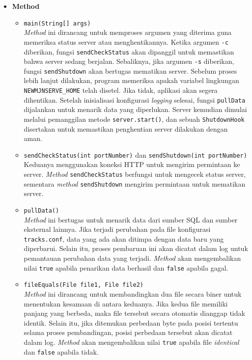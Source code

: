 \begin{itemize}
    \item \textbf{Method}
    \begin{itemize}
        \item \texttt{main(String[] args)}
        \\ \textit{Method} ini dirancang untuk memproses argumen yang diterima guna memeriksa status server atau menghentikannya. Ketika argumen \texttt{-c} diberikan, fungsi \texttt{sendCheckStatus} akan dipanggil untuk memastikan bahwa server sedang berjalan. Sebaliknya, jika argumen \texttt{-s} diberikan, fungsi \texttt{sendShutdown} akan bertugas mematikan server. Sebelum proses lebih lanjut dilakukan, program memeriksa apakah variabel lingkungan \texttt{NEWMJNSERVE\_HOME} telah disetel. Jika tidak, aplikasi akan segera dihentikan. Setelah inisialisasi konfigurasi \textit{logging} selesai, fungsi \texttt{pullData} dijalankan untuk menarik data yang diperlukan. Server kemudian dimulai melalui pemanggilan metode \texttt{server.start()}, dan sebuah \texttt{ShutdownHook} disertakan untuk memastikan penghentian server dilakukan dengan aman.
        
        \item \texttt{sendCheckStatus(int portNumber)} dan \texttt{sendShutdown(int portNumber)}
        \\ Keduanya menggunakan koneksi HTTP untuk mengirim permintaan ke server. \textit{Method} \texttt{sendCheckStatus} berfungsi untuk mengecek status server, sementara \textit{method} \texttt{sendShutdown} mengirim permintaan untuk mematikan server.

        \item \texttt{pullData()}
        \\ \textit{Method} ini bertugas untuk menarik data dari sumber SQL dan sumber eksternal lainnya. Jika terjadi perubahan pada file konfigurasi \texttt{tracks.conf}, data yang ada akan ditimpa dengan data baru yang diperbarui. Selain itu, proses pembaruan ini akan dicatat dalam log untuk pemantauan perubahan data yang terjadi. \textit{Method} akan mengembalikan nilai \texttt{true} apabila penarikan data berhasil dan \texttt{false} apabila gagal.
\newpage
        \item \texttt{fileEquals(File file1, File file2)}
        \\ \textit{Method} ini dirancang untuk membandingkan dua file secara biner untuk menentukan kesamaan di antara keduanya. Jika kedua file memiliki panjang yang berbeda, maka file tersebut secara otomatis dianggap tidak identik. Selain itu, jika ditemukan perbedaan byte pada posisi tertentu selama proses pembandingan, posisi perbedaan tersebut akan dicatat dalam log. \textit{Method} akan mengembalikan nilai \texttt{true} apabila file \textit{identical} dan \texttt{false} apabila tidak.
        
    \end{itemize}
\end{itemize}

